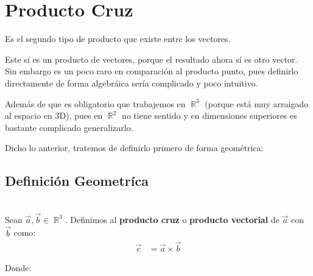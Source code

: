 \documentclass[12pt, fleqn]{report}                             %
\newcommand \Quote {\qq}                                        %
\newcommand \ForceNewLine {$\Space$\\}                          %
\DeclareMathOperator \Space {\quad}                             %
\theoremstyle{break}                                            %
\DeclareMathOperator \Reals        {\mathbb{R}}                 %
\begin{document}
        
        \clearpage
        \section{Producto Cruz}
        
            Es el segundo tipo de producto que existe entre los vectores.

            Este sí es un producto \Quote{genuino} de vectores, porque el resultado ahora sí es otro vector. 
            Sin embargo es un poco raro en comparación al producto punto, pues definirlo directamente de forma
            algebráica sería complicado y poco intuitivo.

            Además de que es obligatorio que trabajemos en $\Reals^3$ (porque está muy arraigado al espacio en 3D),
            pues en $\Reals^2$ no tiene sentido y en dimensiones superiores es bastante complicado generalizarlo.
            
            Dicho lo anterior, tratemos de definirlo primero de forma geométrica:
            
            \subsection{Definición Geometríca}

                \ForceNewLine
                Sean $\vec{a}, \vec{b} \in \Reals^3$. Definimos al \textbf{producto cruz} o
                \textbf{producto vectorial} de $\vec{a}$ con $\vec{b}$ como:
                \begin{align}
                    \vec{c} &= \vec{a} \times \vec{b} \label{defCross}
                \end{align}

                Donde: 
\end{document}
